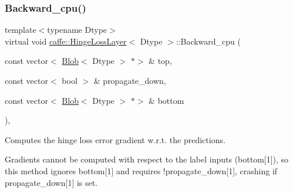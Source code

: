 \subsubsection{\texorpdfstring{Backward\+\_\+cpu()}{Backward\_cpu()}\hspace{0.1cm}{\footnotesize\ttfamily [2/2]}}
{\footnotesize\ttfamily template$<$typename Dtype$>$ \\
virtual void \mbox{\hyperlink{classcaffe_1_1_hinge_loss_layer}{caffe\+::\+Hinge\+Loss\+Layer}}$<$ Dtype $>$\+::Backward\+\_\+cpu (\begin{DoxyParamCaption}\item[{const vector$<$ \mbox{\hyperlink{classcaffe_1_1_blob}{Blob}}$<$ Dtype $>$ $\ast$$>$ \&}]{top,  }\item[{const vector$<$ bool $>$ \&}]{propagate\+\_\+down,  }\item[{const vector$<$ \mbox{\hyperlink{classcaffe_1_1_blob}{Blob}}$<$ Dtype $>$ $\ast$$>$ \&}]{bottom }\end{DoxyParamCaption})\hspace{0.3cm}{\ttfamily [protected]}, {\ttfamily [virtual]}}



Computes the hinge loss error gradient w.\+r.\+t. the predictions. 

Gradients cannot be computed with respect to the label inputs (bottom\mbox{[}1\mbox{]}), so this method ignores bottom\mbox{[}1\mbox{]} and requires !propagate\+\_\+down\mbox{[}1\mbox{]}, crashing if propagate\+\_\+down\mbox{[}1\mbox{]} is set.


